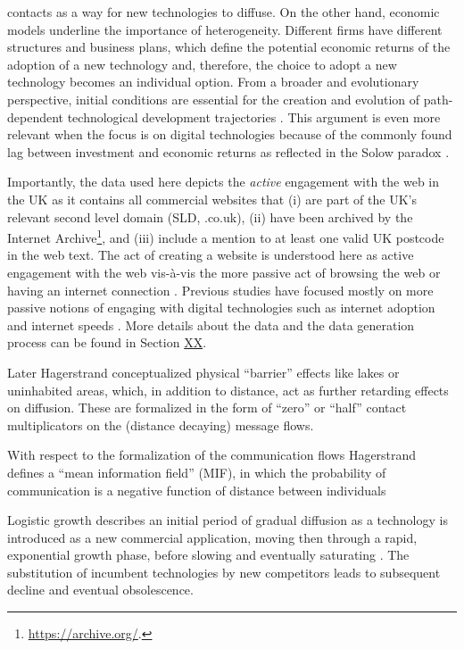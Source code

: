 \documentclass[
  authoryear,
  preprint,
  3p]{elsarticle}
\begin{document}
contacts as a way for new technologies to diffuse. On the other hand,
economic models underline the importance of heterogeneity. Different
firms have different structures and business plans, which define the
potential economic returns of the adoption of a new technology and,
therefore, the choice to adopt a new technology becomes an individual
option. From a broader and evolutionary perspective, initial conditions
are essential for the creation and evolution of path-dependent
technological development trajectories
\citep{neffke2011regions, simmie2014new}. This argument is even more
relevant when the focus is on digital technologies because of the
commonly found lag between investment and economic returns as reflected
in the Solow paradox
\citep{acemoglu2014return, brynjolfsson2018artificial}.

Importantly, the data used here depicts the \emph{active} engagement
with the web in the UK as it contains all commercial websites that (i)
are part of the UK's relevant second level domain (SLD, .co.uk), (ii)
have been archived by the Internet Archive\footnote{\href{See\%20https://archive.org/}{https://archive.org/}.},
and (iii) include a mention to at least one valid UK postcode in the web
text. The act of creating a website is understood here as active
engagement with the web vis-à-vis the more passive act of browsing the
web or having an internet connection \citep{tranosuk}. Previous studies
have focused mostly on more passive notions of engaging with digital
technologies such as internet adoption and internet speeds
\citep[e.g.][]{blank2018local, riddlesden2014broadband}. More details
about the data and the data generation process can be found in Section
\hyperref[sec3]{XX}.

\citet{grubler1990rise} Later Hagerstrand conceptualized physical
``barrier'' effects like lakes or uninhabited areas, which, in addition
to distance, act as further retarding effects on diffusion. These are
formalized in the form of ``zero'' or ``half'' contact multiplicators on
the (distance decaying) message flows.

\citet{grubler1990rise} With respect to the formalization of the
communication flows Hagerstrand defines a ``mean information field''
(MIF), in which the probability of communication is a negative function
of distance between individuals

\citet{wilson201281} Logistic growth describes an initial period of
gradual diffusion as a technology is introduced as a new commercial
application, moving then through a rapid, exponential growth phase,
before slowing and eventually saturating \citep{grubler1999dynamics}.
The substitution of incumbent technologies by new competitors leads to
subsequent decline and eventual obsolescence.
\end{document}
